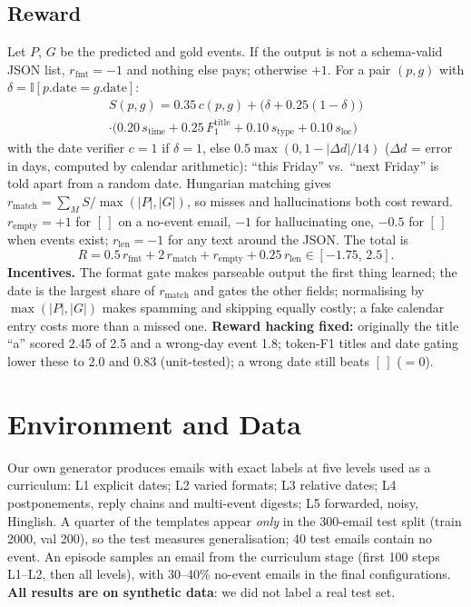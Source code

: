 \documentclass[conference,10pt]{IEEEtran}
\begin{document}
\subsection{Reward}
Let $P$, $G$ be the predicted and gold events. If the output is not a schema-valid JSON list, $r_{\text{fmt}}{=}-1$ and
nothing else pays; otherwise $+1$. For a pair $(p,g)$ with $\delta=\mathbb I[p.\text{date}{=}g.\text{date}]$:
\begin{multline}
S(p,g)=0.35\,c(p,g)+\big(\delta+0.25(1{-}\delta)\big)\\
\cdot\big(0.20\,s_{\text{time}}+0.25\,F_1^{\text{title}}+0.10\,s_{\text{type}}+0.10\,s_{\text{loc}}\big)
\end{multline}
with the date verifier $c=1$ if $\delta{=}1$, else $0.5\max(0,1-|\Delta d|/14)$ ($\Delta d$ = error in days, computed by
calendar arithmetic): ``this Friday'' vs.\ ``next Friday'' is told apart from a random date. Hungarian matching
\cite{kuhn1955hungarian} gives $r_{\text{match}}=\sum_{M}S/\max(|P|,|G|)$, so misses and hallucinations both cost
reward. $r_{\text{empty}}=+1$ for $[\,]$ on a no-event email, $-1$ for hallucinating one, $-0.5$ for $[\,]$ when events
exist; $r_{\text{len}}{=}-1$ for any text around the JSON. The total is
\begin{equation}
R=0.5\,r_{\text{fmt}}+2\,r_{\text{match}}+r_{\text{empty}}+0.25\,r_{\text{len}}\in[-1.75,\,2.5].
\end{equation}
\textbf{Incentives.} The format gate makes parseable output the first thing learned; the date is the largest share of
$r_{\text{match}}$ and gates the other fields; normalising by $\max(|P|,|G|)$ makes spamming and skipping equally costly;
a fake calendar entry costs more than a missed one. \textbf{Reward hacking fixed:} originally the title ``a'' scored 2.45 of 2.5 and a wrong-day event 1.8;
token-F1 titles and date gating lower these to 2.0 and 0.83 (unit-tested); a wrong date still beats $[\,]$ ($=0$).

\section{Environment and Data}
Our own generator produces emails with exact labels at five levels used as a curriculum: L1 explicit dates; L2 varied
formats; L3 relative dates; L4 postponements, reply chains and multi-event digests; L5 forwarded, noisy, Hinglish. A
quarter of the templates appear \emph{only} in the 300-email test split (train 2000, val 200), so the test measures
generalisation; 40 test emails contain no event. An episode samples an email from the curriculum stage (first 100 steps
L1--L2, then all levels), with 30--40\% no-event emails in the final configurations. \textbf{All results are on
synthetic data}: we did not label a real test set.
\end{document}
